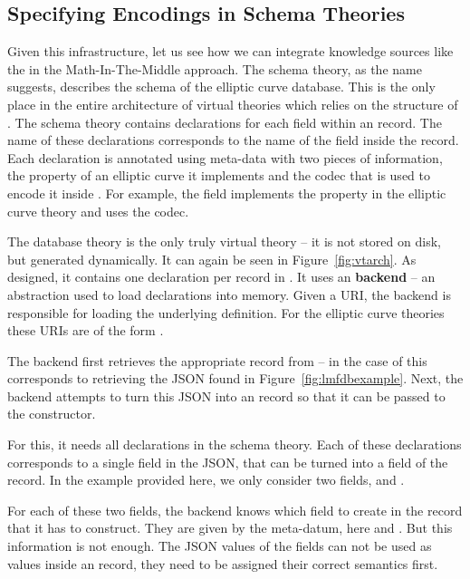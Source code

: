\subsection{Specifying Encodings in Schema Theories}

Given this infrastructure, let us see how we can integrate knowledge sources like the \lmfdb in the Math-In-The-Middle approach. 
The schema theory, as the name suggests, describes the schema of the \lmfdb elliptic curve database. 
This is the only place in the entire architecture of virtual theories which relies on the structure of \lmfdb. 
The schema theory contains declarations for each field within an \lmfdb record. 
The name of these declarations corresponds to the name of the field inside the record. 
Each declaration is annotated using \mmt meta-data with two pieces of information, the property of an elliptic curve it implements and the codec that is used to encode it inside \lmfdb. 
For example, the  field implements the  property in the elliptic curve theory and uses the  codec.

The database theory is the only truly virtual theory -- it is not stored on disk, but generated dynamically. 
It can again be seen in Figure~\ref{fig:vtarch}. 
As designed, it contains one declaration per record in \lmfdb. 
It uses an \mmt \textbf{backend} -- an \mmt abstraction used to load declarations into memory. 
Given a URI, the backend is responsible for loading the underlying definition. 
For the elliptic curve theories these URIs are of the form . 

The backend first retrieves the appropriate record from {\lmfdb} -- in the case of  this corresponds to retrieving the JSON found in Figure~\ref{fig:lmfdbexample}. 
Next, the backend attempts to turn this JSON into an \mmt record so that it can be passed to the  constructor.

For this, it needs all declarations in the schema theory. 
Each of these declarations corresponds to a single field in the JSON, that can be turned into a field of the \mmt record. 
In the example provided here, we only consider two fields,  and .

For each of these two fields, the backend knows which field to create in the \mmt record that it has to construct. 
They are given by the  meta-datum, here  and . 
But this information is not enough. 
The JSON values of the fields can not be used as values inside an \mmt record, they need to be assigned their correct semantics first.

